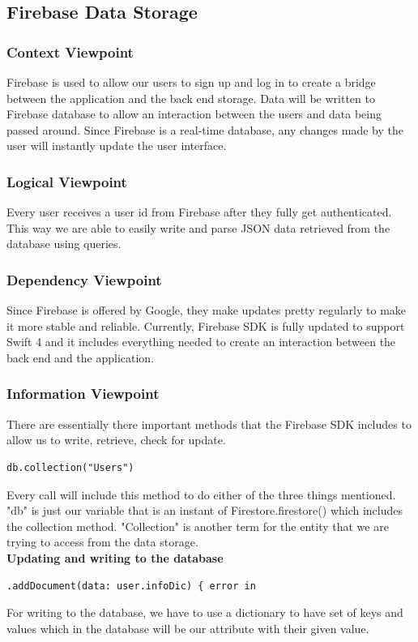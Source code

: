 \documentclass[onecolumn, draftclsnofoot,10pt, compsoc]{IEEEtran}
\begin{document}
\subsection{Firebase Data Storage}
\subsubsection{Context Viewpoint}
Firebase is used to allow our users to sign up and log in to create a bridge between the application and the back end storage. Data will be written to Firebase database to allow an interaction between the users and data being passed around. Since Firebase is a real-time database, any changes made by the user will instantly update the user interface.

\subsubsection{Logical Viewpoint}
Every user receives a user id from Firebase after they fully get authenticated. This way we are able to easily write and parse JSON data retrieved from the database using queries.

\subsubsection{Dependency Viewpoint}
Since Firebase is offered by Google, they make updates pretty regularly to make it more stable and reliable. Currently, Firebase SDK is fully updated to support Swift 4 and it includes everything needed to create an interaction between the back end and the application.
\subsubsection{Information Viewpoint}
There are essentially there important methods that the Firebase SDK includes to allow us to write, retrieve, check for update.
\begin{lstlisting}
db.collection("Users")
\end{lstlisting}
Every call will include this method to do either of the three things mentioned. "db" is just our variable that is an instant of Firestore.firestore()  which includes the collection method. "Collection" is another term for the entity that we are trying to access from the data storage. \\
\noindent\textbf{Updating and writing to the database}
\begin{lstlisting}
.addDocument(data: user.infoDic) { error in
\end{lstlisting}
For writing to the database, we have to use a dictionary to have set of keys and values which in the database will be our attribute with their given value.
\end{document}
